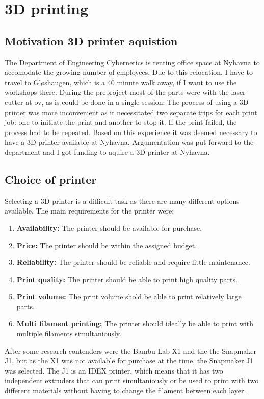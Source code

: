 \section{3D printing}

\subsection{Motivation 3D printer aquistion}
The Department of Engineering Cybernetics is renting office space at Nyhavna to accomodate the growing number of employees.
Due to this relocation, I have to travel to Gløshaugen, which is a 40 minute walk away, if I want to use the workshops there.
During the preproject most of the parts were with the laser cutter at \gls{ov}, as is could be done in a single session.
The process of using a 3D printer was more inconvenient as it necessitated two separate trips for each print job: one to initiate the print and another to stop it.
If the print failed, the process had to be repeated.
Based on this experience it was deemed necessary to have a 3D printer available at Nyhavna.
Argumentation was put forward to the department and I got funding to aquire a 3D printer at Nyhavna.

\subsection{Choice of printer}
Selecting a 3D printer is a difficult task as there are many different options available.
The main requirements for the printer were:
\begin{enumerate}
    \item \textbf{Availability:} The printer should be available for purchase.
    \item \textbf{Price:} The printer should be within the assigned budget.
    \item \textbf{Reliability:} The printer should be reliable and require little maintenance.
    \item \textbf{Print quality:} The printer should be able to print high quality parts.
    \item \textbf{Print volume:} The print volume shold be able to print relatively large parts.
    \item \textbf{Multi filament printing:} The printer should ideally be able to print with multiple filaments simultaniously.
\end{enumerate}

After some research contenders were the Bambu Lab X1 and the the Snapmaker J1, but as the X1 was not available for purchase at the time, the Snapmaker J1 was selected.
The J1 is an IDEX printer, which means that it has two independent extruders that can print simultaniously or be used to print with two different materials without having to change the filament between each layer.

